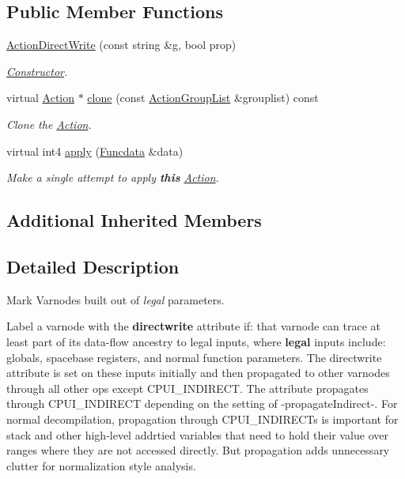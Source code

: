 \subsection*{Public Member Functions}
\begin{DoxyCompactItemize}
\item 
\mbox{\hyperlink{class_action_direct_write_a241c61e946f8c1c31b961fd53bda0657}{Action\+Direct\+Write}} (const string \&g, bool prop)
\begin{DoxyCompactList}\small\item\em \mbox{\hyperlink{class_constructor}{Constructor}}. \end{DoxyCompactList}\item 
virtual \mbox{\hyperlink{class_action}{Action}} $\ast$ \mbox{\hyperlink{class_action_direct_write_adbb35f944b5ae30faf45797be1c6965d}{clone}} (const \mbox{\hyperlink{class_action_group_list}{Action\+Group\+List}} \&grouplist) const
\begin{DoxyCompactList}\small\item\em Clone the \mbox{\hyperlink{class_action}{Action}}. \end{DoxyCompactList}\item 
virtual int4 \mbox{\hyperlink{class_action_direct_write_a02ef8c3c9a53549db52478cd566e320f}{apply}} (\mbox{\hyperlink{class_funcdata}{Funcdata}} \&data)
\begin{DoxyCompactList}\small\item\em Make a single attempt to apply {\bfseries{this}} \mbox{\hyperlink{class_action}{Action}}. \end{DoxyCompactList}\end{DoxyCompactItemize}
\subsection*{Additional Inherited Members}


\subsection{Detailed Description}
Mark Varnodes built out of {\itshape legal} parameters. 

Label a varnode with the {\bfseries{directwrite}} attribute if\+: that varnode can trace at least part of its data-\/flow ancestry to legal inputs, where {\bfseries{legal}} inputs include\+: globals, spacebase registers, and normal function parameters. The directwrite attribute is set on these inputs initially and then propagated to other varnodes through all other ops except C\+P\+U\+I\+\_\+\+I\+N\+D\+I\+R\+E\+CT. The attribute propagates through C\+P\+U\+I\+\_\+\+I\+N\+D\+I\+R\+E\+CT depending on the setting of -\/propagate\+Indirect-\/. For normal decompilation, propagation through C\+P\+U\+I\+\_\+\+I\+N\+D\+I\+R\+E\+C\+Ts is important for stack and other high-\/level addrtied variables that need to hold their value over ranges where they are not accessed directly. But propagation adds unnecessary clutter for normalization style analysis. 

